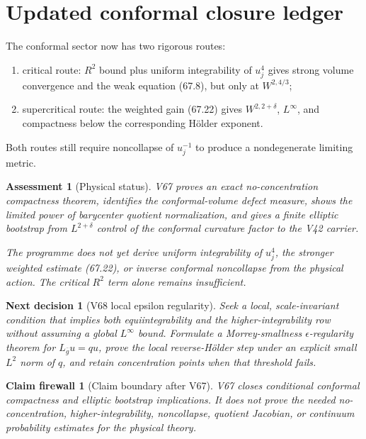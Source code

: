 \documentclass[11pt]{article}
\newtheorem{firewall}[theorem]{Claim firewall}
\newtheorem{decision}[theorem]{Next decision}
\newtheorem{assessment}[theorem]{Assessment}
\theoremstyle{remark}
\begin{document}
\section{Updated conformal closure ledger}

The conformal sector now has two rigorous routes:
\begin{enumerate}
\item critical route: \(R^2\) bound plus uniform integrability of
      \(u_j^4\) gives strong volume convergence and the weak
      equation (67.8), but only at \(W^{2,4/3}\);
\item supercritical route: the weighted gain (67.22) gives
      \(W^{2,2+\delta}\), \(L^\infty\), and compactness below the
      corresponding H\"older exponent.
\end{enumerate}
Both routes still require noncollapse of \(u_j^{-1}\) to produce a
nondegenerate limiting metric.

\begin{assessment}[Physical status]
\label{ass:v15v67-status}
V67 proves an exact no-concentration compactness theorem, identifies
the conformal-volume defect measure, shows the limited power of
barycenter quotient normalization, and gives a finite elliptic
bootstrap from \(L^{2+\delta}\) control of the conformal curvature
factor to the V42 carrier.

The programme does not yet derive uniform integrability of \(u_j^4\),
the stronger weighted estimate (67.22), or inverse conformal
noncollapse from the physical action.  The critical \(R^2\) term
alone remains insufficient.
\end{assessment}

\begin{decision}[V68 local epsilon regularity]
\label{dec:v15v67-next}
Seek a local, scale-invariant condition that implies both
equiintegrability and the higher-integrability row without assuming
a global \(L^\infty\) bound.  Formulate a Morrey-smallness
\(\epsilon\)-regularity theorem for
\(L_{\bar g}u=qu\), prove the local reverse-H\"older step under an
explicit small \(L^2\) norm of \(q\), and retain concentration
points when that threshold fails.
\end{decision}

\begin{firewall}[Claim boundary after V67]
\label{fire:v15v67}
V67 closes conditional conformal compactness and elliptic
bootstrap implications.  It does not prove the needed
no-concentration, higher-integrability, noncollapse, quotient
Jacobian, or continuum probability estimates for the physical
theory.
\end{firewall}
\end{document}
